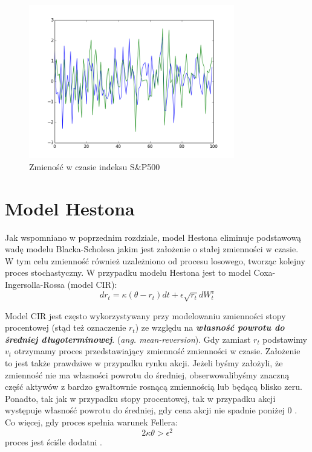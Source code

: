 \documentclass{pracamgr}
\begin{document}
\begin{figure}
  \centering
  \includegraphics[width=0.80\textwidth]{corr.png}
  \caption{Zmieność w czasie indeksu S\&P500}\label{fig:vix}
\end{figure} 

\section{Model Hestona}
Jak wspomniano w poprzednim rozdziale, model Hestona eliminuje podstawową wadę modelu Blacka-Scholesa jakim jest założenie o stałej zmienności w czasie.
W tym celu zmienność również uzależniono od procesu losowego, tworząc kolejny proces stochastyczny. W przypadku modelu Hestona jest to model Coxa-Ingersolla-Rossa (model CIR):
\begin{equation}
dr_t  = \kappa (\theta  - r_t)dt + \epsilon \sqrt{r_t} dW_t^v 
\end{equation}

Model CIR jest często wykorzystywany przy modelowaniu zmienności stopy procentowej (stąd też oznaczenie $r_t$) ze względu na \textbf{\textit{własność powrotu do średniej długoterminowej}}. 
(\textit{ang. mean-reversion}). Gdy zamiast $r_t$ podstawimy $v_t$ otrzymamy proces przedstawiający zmienność zmienności w czasie. Założenie to jest także prawdziwe w przypadku rynku 
akcji. Jeżeli byśmy założyli, że zmienność nie ma własności powrotu do średniej, obserwowalibyśmy znaczną część aktywów z bardzo gwałtownie rosnącą zmiennością lub będącą blisko zeru.
Ponadto, tak jak w przypadku stopy procentowej, tak w przypadku akcji występuje własność powrotu do średniej, gdy cena akcji nie spadnie poniżej 0 \cite{TestingMeanReversion}.
Co więcej, gdy proces spełnia warunek Fellera:
\begin{equation}
2 \kappa \theta > \epsilon^2
\end{equation}
proces jest ściśle dodatni \cite{TheLittleHestonTrap}.
\end{document}
